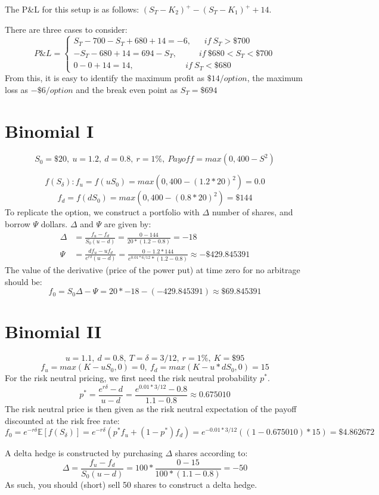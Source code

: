 \documentclass{article}
\begin{document}
The P\&L for this setup is as follows: $(S_T - K_2)^+ - (S_T - K_1)^+ + 14$.

There are three cases to consider:
$$P\&L = \begin{cases} S_T - 700 - S_T + 680 + 14 = -6, \ \ \ \ \ \ \ if \ S_T > \$700 \\ -S_T - 680 + 14 = 694 - S_T, \ \ \ \ \ \ \ \ \ \ \  \ if \ \$680<S_T<\$700 \\ 0 - 0 + 14 = 14, \ \ \ \ \ \ \ \ \ \ \ \ \ \ \ \ \ \ \ \ \ \ \ \ \ \ \ \  if \ S_T < \$680\end{cases}$$
From this, it is easy to identify the maximum profit as $\$14/option$, the maximum loss as $-\$6/option$ and the break even point as $S_T=\$694$

\section{Binomial I}
$$ S_0 = \$20, \ u = 1.2, \ d = 0.8, \ r=1\%, \ Payoff = max(0, 400 - S^2)$$

$$f(S_{\delta}): f_u = f(uS_0) = max(0, 400 - (1.2*20)^2) = 0.0$$
$$f_d = f(dS_0) = max(0, 400 - (0.8*20)^2) = \$144$$
To replicate the option, we construct a portfolio with $\Delta$ number of shares, and borrow $\Psi$ dollars. $\Delta$ and $\Psi$ are given by:
\begin{align*}
	\Delta &= \frac{f_u - f_d}{S_0 (u -d)} = \frac{0 - 144}{20 * (1.2 - 0.8)} = -18 \\
	\Psi &= \frac{df_u - uf_d}{e^{r\delta}(u-d)} = \frac{0 - 1.2 * 144}{e^{0.01 * 6/12} * (1.2-0.8)} \approx -\$429.845391
\end{align*}
The value of the derivative (price of the power put) at time zero for no arbitrage should be:
$$f_0 = S_0\Delta - \Psi = 20*-18 - (-429.845391) \approx \$69.845391 $$

\section{Binomial II}
$$u = 1.1, \ d = 0.8, \ T=\delta=3/12, \ r = 1\%, \ K = \$95$$
$$f_u = max(K - uS_0, 0) = 0, \ f_d = max(K - u * dS_0, 0) = 15$$
For the risk neutral pricing, we first need the risk neutral probability $p^*$.
$$p^* = \frac{e^{r\delta} - d}{u - d} = \frac{e^{0.01 * 3/12}-0.8}{1.1-0.8} \approx 0.675010$$
The risk neutral price is then given as the risk neutral expectation of the payoff discounted at the risk free rate:
$$f_0 = e^{-r\delta}\mathbb{E}[f(S_{\delta})] = e^{-r\delta}\left(p^*f_u + (1-p^*)f_d\right) = e^{-0.01*3/12}\left((1-0.675010)*15\right) = \$4.862672$$

A delta hedge is constructed by purchasing $\Delta$ shares according to:
$$\Delta = \frac{f_u-f_d}{S_0(u-d)} = 100 * \frac{0 - 15}{100 * (1.1 - 0.8)} = -50$$
As such, you should (short) sell 50 shares to construct a delta hedge.
\end{document}
